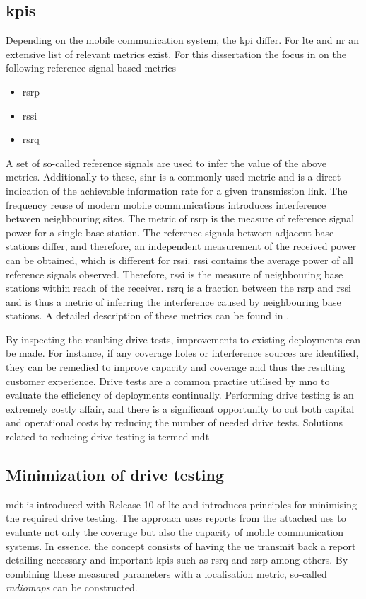 \subsection{\glspl{kpi}}
Depending on the mobile communication system, the \gls{kpi} differ. For \gls{lte} and \gls{nr} an extensive list of relevant metrics exist. For this dissertation the focus in on the following reference signal based metrics
\begin{itemize}
    \item \gls{rsrp}
    \item \gls{rssi}
    \item \gls{rsrq}
\end{itemize}

A set of so-called reference signals are used to infer the value of the above metrics. Additionally to these, \gls{sinr} is a commonly used metric and is a direct indication of the achievable information rate for a given transmission link. The frequency reuse of modern mobile communications introduces interference between neighbouring sites. The metric of \gls{rsrp} is the measure of reference signal power for a single base station. The reference signals between adjacent base stations differ, and therefore, an independent measurement of the received power can be obtained, which is different for \gls{rssi}. \gls{rssi} contains the average power of all reference signals observed. Therefore, \gls{rssi} is the measure of neighbouring base stations within reach of the receiver. \gls{rsrq} is a fraction between the \gls{rsrp} and \gls{rssi} and is thus a metric of inferring the interference caused by neighbouring base stations. A detailed description of these metrics can be found in \cite{Molisch2007}.

By inspecting the resulting drive tests, improvements to existing deployments can be made. For instance, if any coverage holes or interference sources are identified, they can be remedied to improve capacity and coverage and thus the resulting customer experience. Drive tests are a common practise utilised by \gls{mno} to evaluate the efficiency of deployments continually. Performing drive testing is an extremely costly affair, and there is a significant opportunity to cut both capital and operational costs by reducing the number of needed drive tests. Solutions related to reducing drive testing is termed \gls{mdt}


\subsection{Minimization of drive testing}
\gls{mdt} is introduced with Release 10 of \gls{lte} and introduces principles for minimising the required drive testing. The approach uses reports from the attached \glspl{ue} to evaluate not only the coverage but also the capacity of mobile communication systems. In essence, the concept consists of having the \gls{ue} transmit back a report detailing necessary and important \glspl{kpi} such as \gls{rsrq} and \gls{rsrp} among others. By combining these measured parameters with a localisation metric, so-called \emph{radiomaps} can be constructed. 

